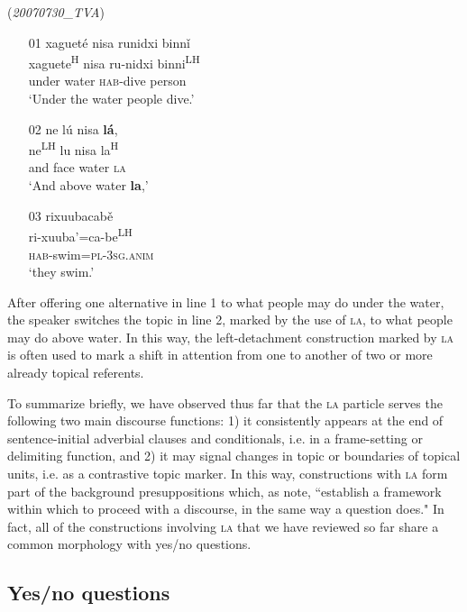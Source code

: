 \ea\label{alternatives2} (\textit{20070730{\_}TVA})
\begin{itemize}
\item[01]
\glll xaguet\'{e} nisa runidxi binn\v{i}  \\
xaguete\textsuperscript{H} nisa ru-nidxi binni\textsuperscript{LH}  \\
under water \textsc{hab}-dive person  \\
\glt `Under the water people dive.'


\item[02]
\glll ne l\'{u} nisa \textbf{l\'{a}}, \\
ne\textsuperscript{LH} lu nisa la\textsuperscript{H}  \\
and face water \textsc{la}  \\
\glt `And above water \textbf{la},'


\item[03]
\glll rixuubacab\v{e} \\
ri-xuuba'=ca-be\textsuperscript{LH}  \\
\textsc{hab}-swim=\textsc{pl}-3\textsc{sg.anim}  \\
\glt `they swim.' 

\end{itemize}
\z
After offering one alternative in line 1 to what people may do under the water, the speaker switches the topic in line 2, marked by the use of \textsc{la}, to what people may do above water. In this way, the left-detachment construction marked by \textsc{la} is often used to mark a shift in attention from one to another of two or more already topical referents. 

To summarize briefly, we have observed thus far that the \textsc{la} particle serves the following two main discourse functions: 1) it consistently appears at the end of sentence-initial adverbial clauses and conditionals, i.e. in a frame-setting or delimiting function, and 2) it may signal changes in topic or boundaries of topical units, i.e. as a contrastive topic marker. In this way, constructions with \textsc{la} form part of the background presuppositions which, as \citet[292]{thompson2007} note, ``establish a framework within which to proceed with a discourse, in the same way a question does." In fact, all of the constructions involving \textsc{la} that we have reviewed so far share a common morphology with yes/no questions. 


\subsection{Yes/no questions}

